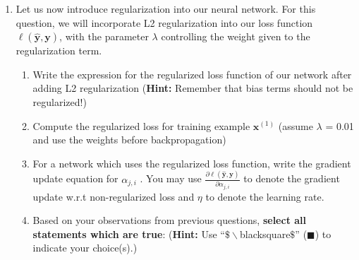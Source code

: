 \documentclass{article}
\newcommand{\xv}{\mathbf{x}}
\newcommand{\yv}{\mathbf{y}}
\theoremstyle{definition}
\theoremstyle{remark}
\newenvironment{Q_nosol}
{%
\clearpage
\item
}
{%
\phantom{s} %
\bigskip
}
\begin{document}
\begin{enumerate}[font={\Large\bfseries},left=0pt]
\begin{Q_nosol}
\begin{enumerate}
\begin{enumerate}
        \begin{tcolorbox}

        \end{tcolorbox}

    \end{enumerate}

\clearpage
\item Let us now introduce regularization into our neural network. For this question, we will incorporate L2 regularization into our loss function $\ell(\hat{\yv},\yv)$, with the parameter $\lambda$ controlling the weight given to the regularization term. 
\begin{enumerate}
    \item Write the expression for the regularized loss function of our network after adding L2 regularization (\textbf{Hint:} Remember that bias terms should not be regularized!) 
    \begin{tcolorbox}

        \end{tcolorbox}
        
        
    \item Compute the regularized loss for training example $\xv^{(1)}$ (assume $\lambda$ = 0.01 and use the weights before backpropagation)
     \begin{tcolorbox}

        \end{tcolorbox}
        
    
     \item For a network which uses the regularized loss function, write the gradient update equation for $\alpha_{j,i}$ . You may use $\frac{\partial \ell(\hat{\yv},\yv)}{\partial \alpha_{j,i}}$ to denote the gradient update w.r.t non-regularized loss and $\eta$ to denote the learning rate.
    \begin{tcolorbox}

        \end{tcolorbox}
    
    
    
    \item Based on your observations from previous questions, \textbf{select all statements which are true}:  (\textbf{Hint:} Use ``$\$\backslash$blacksquare$\$$'' ($\blacksquare$) to indicate your choice(s).)


\end{enumerate}
\end{enumerate}
\end{Q_nosol}
\end{enumerate}
\end{document}
